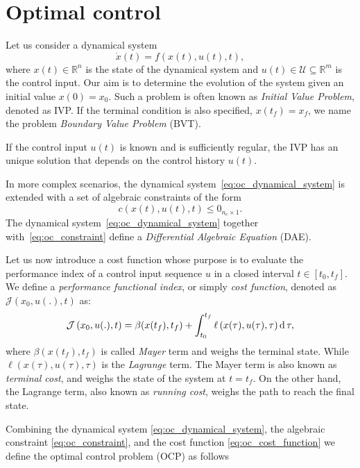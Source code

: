 \section{Optimal control\label{sec:optimal_control}}
Let us consider a dynamical system 
\begin{equation}
    \label{eq:oc_dynamical_system}
    \dot{x}(t) = f(x(t), u(t), t),
\end{equation}
where $x(t) \in \mathbb{R}^n$ is the state of the dynamical system and $u(t) \in \mathcal{U} \subseteq \mathbb{R}^m$ is the control input. 
Our aim is to determine the evolution of the system given an initial value $x(0) = x_0$. Such a problem is often known as \emph{Initial Value Problem}, denoted as IVP. If the terminal condition is also specified, $x(t_f) = x_f$, we name the problem \emph{Boundary Value Problem} (BVT).
\par
If the control input $u(t)$ is known and is sufficiently regular, the IVP has an unique solution that depends on the control history $u(t)$.
\par
In more complex scenarios, the dynamical system~\eqref{eq:oc_dynamical_system} is extended with a set of algebraic constraints of the form
\begin{equation}
    \label{eq:oc_constraint}
    c(x(t), u(t), t) \le 0_{n_c \times 1}.
\end{equation}
The dynamical system~\eqref{eq:oc_dynamical_system} together with~\eqref{eq:oc_constraint} define a \emph{Differential Algebraic Equation} (DAE).
\par
Let us now introduce a cost function whose purpose is to evaluate the performance index of a control input sequence $u$ in a closed interval $t\in[t_0, t_f]$. We define a \emph{performance functional index}, or simply \emph{cost function}, denoted as $\mathcal{J}(x_0, u(.), t)$ as:
\begin{equation}
    \label{eq:oc_cost_function}
    \mathcal{J}\left(x_0, u(.), t \right) = \beta(x(t_f), t_f) + \int_{t_0} ^{t_f} \ell\left(x(\tau), u(\tau), \tau\right) \operatorname{d} \tau,
\end{equation}
where $\beta(x(t_f), t_f)$ is called \emph{Mayer} term and weighs the terminal state. While $\ell\left(x(\tau), u(\tau), \tau\right)$ is the \emph{Lagrange} term. The Mayer term is also known as \emph{terminal cost}, and weighs the state of the system at $t = t_f$. On the other hand, the Lagrange term, also known as \emph{running cost}, weighs the path to reach the final state.
\par
Combining the dynamical system \eqref{eq:oc_dynamical_system}, the algebraic constraint \eqref{eq:oc_constraint}, and the cost function \eqref{eq:oc_cost_function} we define the optimal control problem (OCP) as follows
